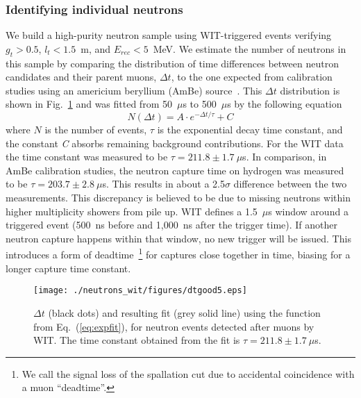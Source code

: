 \subsubsection{Identifying individual neutrons}
\label{subsec:hadronic_data}
 We build a high-purity neutron sample using WIT-triggered events verifying $g_t > 0.5$, $l_t < 1.5$~m, and $E_{rec} <  5$~MeV. We estimate the number of neutrons in this sample by comparing the distribution of time differences between neutron candidates and their parent muons, $\Delta t$, to the one expected from calibration studies using an americium beryllium (AmBe) source~\cite{Super-Kamiokande:2008mmn}. This $\Delta t$ distribution is shown in Fig.~\ref{fig:neutdt} and was fitted from 50~$\mu$s to 500~$\mu$s by the following equation
\begin{equation}
    N(\Delta t) = A\cdot e^{-\Delta t/\tau} + C
    \label{eq:expfit}
\end{equation}
where $N$ is the number of events, $\tau$ is the exponential decay time constant, and the constant {\it C} absorbs remaining background contributions. For the WIT data the time constant was measured to be $\tau = 211.8 \pm 1.7~\mu$s. In comparison, in AmBe calibration studies, the neutron capture time on hydrogen was measured to be $\tau = 203.7 \pm 2.8~\mu$s. This results in about a 2.5$\sigma$ difference between the two measurements. This discrepancy is believed to be due to missing neutrons within higher multiplicity showers from pile up. WIT defines a 1.5~$\mu$s window around a triggered event (500~ns before and 1,000~ns after the trigger time). If another neutron capture happens within that window, no new trigger will be issued. This introduces a form of deadtime~\footnote{We call the signal loss of the spallation cut due to accidental coincidence with a muon ``deadtime''.} for captures close together in time, biasing for a longer capture time constant.

\begin{figure}
    \centering
    \texttt{[image: ./neutrons\_wit/figures/dtgood5.eps]}
    \caption{$\Delta t$ (black dots) and resulting fit (grey solid line) using the function from Eq.~(\ref{eq:expfit}), for neutron events detected after muons by WIT. The time constant obtained from the fit is $\tau = 211.8 \pm 1.7~\mu$s.}
    \label{fig:neutdt}
\end{figure}

